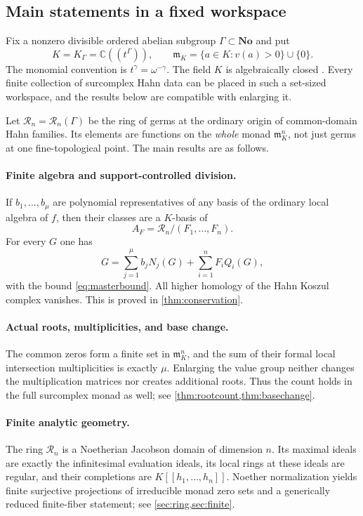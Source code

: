 \documentclass[11pt]{article}
\theoremstyle{definition}
\newcommand{\C}{\mathbb C}
\newcommand{\No}{\mathbf{No}}
\newcommand{\RR}{\mathscr R}
\newcommand{\mm}{\mathfrak m}
\begin{document}
\subsection{Main statements in a fixed workspace}
Fix a nonzero divisible ordered abelian subgroup $\Gamma\subset\No$ and put
\[
 K=K_\Gamma=\C((t^\Gamma)),\qquad
 \mm_K=\{a\in K:v(a)>0\}\cup\{0\}.
\]
The monomial convention is $t^\gamma=\omega^{-\gamma}$. The field $K$ is algebraically closed \cite{Poonen}. Every finite collection of surcomplex Hahn data can be placed in such a set-sized workspace, and the results below are compatible with enlarging it.

Let $\RR_n=\RR_n(\Gamma)$ be the ring of germs at the ordinary origin of common-domain Hahn families. Its elements are functions on the \emph{whole} monad $\mm_K^n$, not just germs at one fine-topological point. The main results are as follows.

\paragraph{Finite algebra and support-controlled division.}
If $b_1,\ldots,b_\mu$ are polynomial representatives of any basis of the ordinary local algebra of $f$, then their classes are a $K$-basis of
\[
 A_F=\RR_n/(F_1,\ldots,F_n).
\]
For every $G$ one has
\[
 G=\sum_{j=1}^{\mu}b_jN_j(G)+\sum_{i=1}^{n}F_iQ_i(G),
\]
with the bound \eqref{eq:masterbound}. All higher homology of the Hahn Koszul complex vanishes. This is proved in \cref{thm:conservation}.

\paragraph{Actual roots, multiplicities, and base change.}
The common zeros form a finite set in $\mm_K^n$, and the sum of their formal local intersection multiplicities is exactly $\mu$. Enlarging the value group neither changes the multiplication matrices nor creates additional roots. Thus the count holds in the full surcomplex monad as well; see \cref{thm:rootcount,thm:basechange}.

\paragraph{Finite analytic geometry.}
The ring $\RR_n$ is a Noetherian Jacobson domain of dimension $n$. Its maximal ideals are exactly the infinitesimal evaluation ideals, its local rings at these ideals are regular, and their completions are $K[[h_1,\ldots,h_n]]$. Noether normalization yields finite surjective projections of irreducible monad zero sets and a generically reduced finite-fiber statement; see \cref{sec:ring,sec:finite}.
\end{document}
